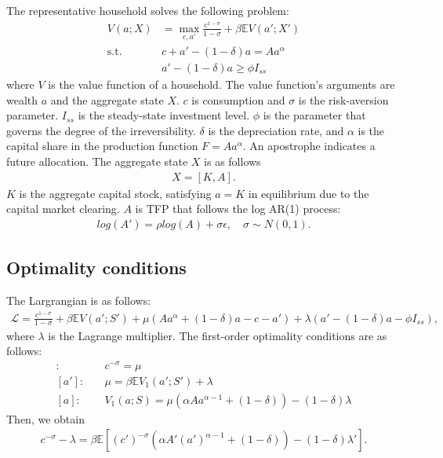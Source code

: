The representative household solves the following problem:
\begin{align*}
  V(a;X) &= \max_{c,a'} \frac{c^{1-\sigma}}{1-\sigma} + \beta \mathbb{E}V(a';X')
  \\
  \text{s.t. }& 
  c+a' - (1-\delta)a = Aa^{\alpha}
  \\
  &
  a' - (1-\delta)a \geq \phi I_{ss}
\end{align*}
where $V$ is the value function of a household. The value function's arguments are wealth $a$ and the aggregate state $X$. $c$ is consumption and $\sigma$ is the risk-aversion parameter.
$I_{ss}$ is the steady-state investment level. $\phi$ is the parameter that governs the degree of the irreversibility. $\delta$ is the depreciation rate, and $\alpha$ is the capital share in the production function $F = Aa^{\alpha}$.
An apostrophe indicates a future allocation.
The aggregate state $X$ is as follows
\begin{align*}
  X = [K,A].
\end{align*}
$K$ is the aggregate capital stock, satisfying $a=K$ in equilibrium due to the capital market clearing. $A$ is TFP that follows the log AR(1) process:
\begin{align*}
  log(A') = \rho log(A) + \sigma\epsilon,\quad\sigma\sim N(0,1).
\end{align*}
\subsection*{Optimality conditions}
The Largrangian is as follows:
\begin{align*}
  \mathcal{L} = \frac{c^{1-\sigma}}{1-\sigma} + \beta \mathbb{E}V(a';S') + \mu(Aa^{\alpha} + (1-\delta)a- c-a' ) + \lambda(a' - (1-\delta)a - \phi I_{ss}),
\end{align*}
where $\lambda$ is the Lagrange multiplier.
The first-order optimality conditions are as follows:
\begin{align*}
  [c]:&\quad c^{-\sigma} = \mu
  \\
  [a']:&\quad \mu = \beta \mathbb{E}V_{1}(a';S') + \lambda
  \\
  [a]:&\quad V_{1}(a;S) = \mu(\alpha A a^{\alpha-1} + (1-\delta)) - (1-\delta)\lambda
\end{align*}
Then, we obtain
\begin{align*}
  c^{-\sigma} -\lambda= \beta \mathbb{E}\left[(c')^{-\sigma}(\alpha A' (a')^{\alpha-1}+(1-\delta)) -(1-\delta)\lambda'\right].
\end{align*}